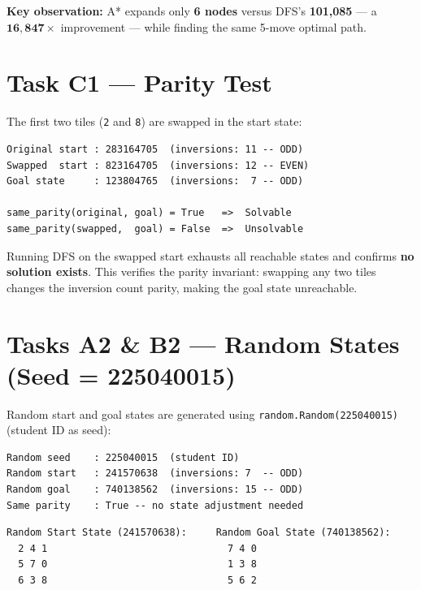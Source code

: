 \documentclass[12pt, a4paper]{article}
\begin{document}
\medskip
\noindent\colorbox{boxbg}{\parbox{\linewidth-2\fboxsep}{%
\textbf{Key observation:} A* expands only \textbf{6 nodes} versus DFS's \textbf{101,085} --- a $\mathbf{16{,}847\times}$ improvement --- while finding the same 5-move optimal path.
}}

\section{Task C1 --- Parity Test}

The first two tiles (\texttt{2} and \texttt{8}) are swapped in the start state:

\begin{lstlisting}[style=mono]
Original start : 283164705  (inversions: 11 -- ODD)
Swapped  start : 823164705  (inversions: 12 -- EVEN)
Goal state     : 123804765  (inversions:  7 -- ODD)

same_parity(original, goal) = True   =>  Solvable
same_parity(swapped,  goal) = False  =>  Unsolvable
\end{lstlisting}

Running DFS on the swapped start exhausts all reachable states and confirms \textbf{no solution exists}. This verifies the parity invariant: swapping any two tiles changes the inversion count parity, making the goal state unreachable.

\section{Tasks A2 \& B2 --- Random States (Seed = 225040015)}

Random start and goal states are generated using \texttt{random.Random(225040015)} (student ID as seed):

\begin{lstlisting}[style=mono]
Random seed    : 225040015  (student ID)
Random start   : 241570638  (inversions: 7  -- ODD)
Random goal    : 740138562  (inversions: 15 -- ODD)
Same parity    : True -- no state adjustment needed
\end{lstlisting}

\begin{lstlisting}[style=mono]
Random Start State (241570638):     Random Goal State (740138562):
  2 4 1                               7 4 0
  5 7 0                               1 3 8
  6 3 8                               5 6 2
\end{lstlisting}
\end{document}
